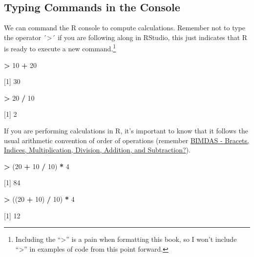 \documentclass[
]{book}
\newenvironment{Shaded}{\begin{snugshade}}{\end{snugshade}}
\newcommand{\DecValTok}[1]{\textcolor[rgb]{0.00,0.00,0.81}{#1}}
\newcommand{\NormalTok}[1]{#1}
\newcommand{\SpecialCharTok}[1]{\textcolor[rgb]{0.81,0.36,0.00}{\textbf{#1}}}
\begin{document}
\hypertarget{typing-commands-in-the-console}{%
\subsection{Typing Commands in the Console}\label{typing-commands-in-the-console}}

We can command the R console to compute calculations. Remember not to type the operator ´\textgreater´ if you are following along in RStudio, this just indicates that R is ready to execute a new command.\footnote{Including the ``\textgreater{}'' is a pain when formatting this book, so I won't include ``\textgreater{}'' in examples of code from this point forward.}

\begin{Shaded}
\begin{Highlighting}[]
\SpecialCharTok{\textgreater{}} \DecValTok{10} \SpecialCharTok{+} \DecValTok{20}

\NormalTok{[}\DecValTok{1}\NormalTok{] }\DecValTok{30}
\end{Highlighting}
\end{Shaded}

\begin{Shaded}
\begin{Highlighting}[]
\SpecialCharTok{\textgreater{}} \DecValTok{20} \SpecialCharTok{/} \DecValTok{10}

\NormalTok{[}\DecValTok{1}\NormalTok{] }\DecValTok{2}
\end{Highlighting}
\end{Shaded}

If you are performing calculations in R, it's important to know that it follows the usual arithmetic convention of order of operations (remember \href{https://www.tes.com/en-ie/teaching-resource/bidmas-bodmas-bedmas-bimdas-pemdas-permdas-11154272\#:~:text=\%E2\%80\%A2\%20BIMDAS\%20\%2D\%20Brackets\%2C\%20Indices\%2C,Multiplication\%2C\%20Division\%2C\%20Addition\%2C\%20Subtraction}{BIMDAS - Bracets, Indices, Multiplication, Division, Addition, and Subtraction?}).

\begin{Shaded}
\begin{Highlighting}[]
\SpecialCharTok{\textgreater{}}\NormalTok{ (}\DecValTok{20} \SpecialCharTok{+} \DecValTok{10} \SpecialCharTok{/} \DecValTok{10}\NormalTok{) }\SpecialCharTok{*} \DecValTok{4} 

\NormalTok{[}\DecValTok{1}\NormalTok{] }\DecValTok{84}

\SpecialCharTok{\textgreater{}}\NormalTok{ ((}\DecValTok{20} \SpecialCharTok{+} \DecValTok{10}\NormalTok{) }\SpecialCharTok{/} \DecValTok{10}\NormalTok{) }\SpecialCharTok{*} \DecValTok{4}

\NormalTok{[}\DecValTok{1}\NormalTok{] }\DecValTok{12}
\end{Highlighting}
\end{Shaded}
\end{document}
